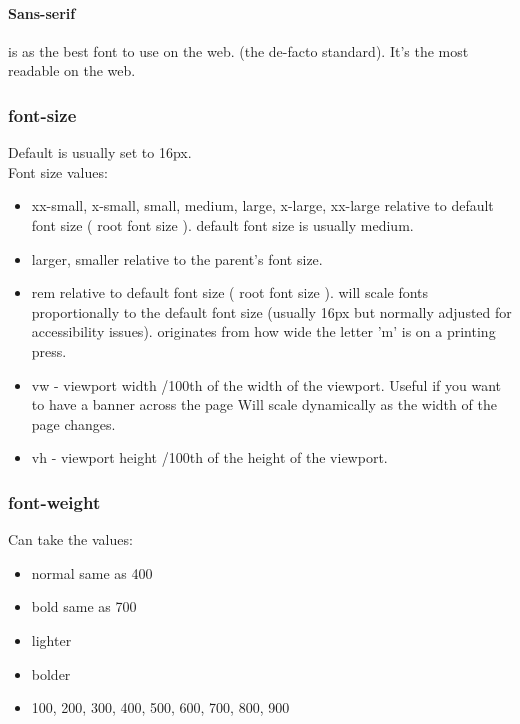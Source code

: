 \documentclass[]{article}
\begin{document}
\paragraph{Sans-serif} is as the best font to use on the web. (the de-facto standard).  It's the most readable on the web.

\subsubsection{font-size}
Default is usually set to 16px.
\\
Font size values:
\begin{itemize}
	\item xx-small, x-small, small, medium, large, x-large, xx-large
	\subitem relative to default font size ( root font size ).
	\subitem default font size is usually medium.
	
	\item larger, smaller 
	\subitem relative to the parent's font size.
	
	\item rem 
	\subitem relative to default font size ( root font size ).
	\subitem will scale fonts proportionally to the default font size (usually 16px but normally adjusted for accessibility issues).
	\subitem originates from how wide the letter 'm' is on a printing press.
	
	\item vw - viewport width 
	/100th of the width of the viewport.
	\subitem Useful if you want to have a banner across the page 
	\subitem Will scale dynamically as the width of the page changes.
	
	\item vh - viewport height
	/100th of the height of the viewport.
\end{itemize}

\subsubsection{font-weight}
Can take the values:
\begin{itemize}
	\item normal
	\subitem same as 400
	
	\item bold
	\subitem same as 700
	
	\item lighter
	\item bolder
	\item 100, 200, 300, 400, 500, 600, 700, 800, 900
\end{itemize}
\end{document}
